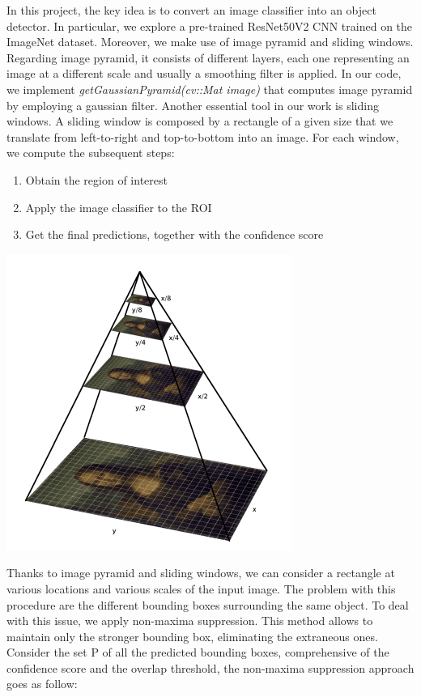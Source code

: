 In this project, the key idea is to convert an image classifier into an object detector. In particular, we explore a pre-trained ResNet50V2 CNN trained on the ImageNet dataset. Moreover, we make use of image pyramid and sliding windows.
Regarding image pyramid, it consists of different layers, each one representing an image at a different scale and usually a smoothing filter is applied. In our code, we implement  \textit{getGaussianPyramid(cv::Mat image)} that computes image pyramid by employing a gaussian filter. \newline Another essential tool in our work is sliding windows. A sliding window is composed by a rectangle of a given size that we translate from left-to-right and top-to-bottom into an image. For each window, we compute the subsequent steps:
\begin{enumerate}
    \item Obtain the region of interest
    \item Apply the image classifier to the ROI
    \item Get the final predictions, together with the confidence score
\end{enumerate}
\begin{center}
    \includegraphics[scale=0.75]{images/detection_chapter/gaussian_pyramid.PNG}
\end{center}
Thanks to image pyramid and sliding windows, we can consider a rectangle at various locations and various scales of the input image. The problem with this procedure are the different bounding boxes surrounding the same object. To deal with this issue, we apply non-maxima suppression. This method allows to maintain only the stronger bounding box, eliminating the extraneous ones. Consider the set P of all the predicted bounding boxes, comprehensive of the confidence score and the overlap threshold, the non-maxima suppression approach goes as follow:
